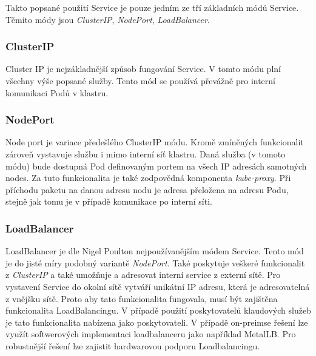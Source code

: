 Takto popsané použití Service je pouze jedním ze tří základních módů Service. Těmito módy jsou \textit{ClusterIP}, \textit{NodePort}, \textit{LoadBalancer}. \cite{poulton_2022_the}%

\subsubsection{ClusterIP}
Cluster IP je nejzákladnější způsob fungování Service. V tomto módu plní všechny výše popsané služby. Tento mód se používá převážně pro interní komunikaci Podů v klastru. \cite{thekubernetesauthors_2023_service}
\subsubsection{NodePort}
Node port je variace předešlého ClusterIP módu. Kromě zmíněných funkcionalit zároveň vystavuje službu i mimo interní síť klastru. Daná služba (v tomoto módu) bude dostupná Pod definovaným portem na všech IP adresách samotných nodes. Za tuto funkcionalita je také zodpovědná komponenta \textit{kube-proxy}. Při příchodu paketu na danou adresu nodu je adresa přeložena na adresu Podu, stejně jak tomu je v případě komunikace po interní síti. \cite{thekubernetesauthors_2023_service}   
\subsubsection{LoadBalancer}
LoadBalancer je dle Nigel Poulton \cite{poulton_2022_the} nejpoužívanějším módem Service. Tento mód je do jisté míry podobný variantě \textit{NodePort}. Také poskytuje veškeré funkcionalit z \textit{ClusterIP} a také umožňuje a adresovat interní service z externí sítě. Pro vystavení Service do okolní sítě vytváří unikátní IP adresu, která je adresovatelná z vnějšku sítě. Proto aby tato funkcionalita fungovala, musí být zajištěna funkcionalita LoadBalancingu. V případě použití poskytovatelů klaudových služeb je tato funkcionalita nabízena jako poskytovateli. V případě on-preimse řešení lze využít softwerových implementaci loadbalanceru jako například MetalLB. Pro robustnější řešení lze zajistit hardwarovou podporu Loadbalancingu. \cite{thekubernetesauthors_2023_service}


